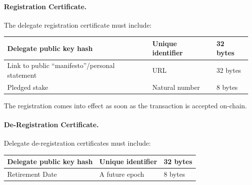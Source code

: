 

\paragraph{Registration Certificate.} The delegate registration certificate must include:

\begin{center}
\begin{tabular}{||l|p{3in}|l||}
  \hline\hline
  Delegate public key hash %
           & Unique identifier & 32 bytes
  \\\hline
  Link to public ``manifesto''/personal statement & URL & 32 bytes
  \\\hline
  Pledged stake & Natural number & 8 bytes
  \\\hline
  \hline
\end{tabular}
\end{center}

The registration comes into effect as soon as the transaction is accepted on-chain.

\paragraph{De-Registration Certificate.} Delegate de-registration certificates must include:

\begin{center}
\begin{tabular}{||l|p{3in}|l||}
  \hline\hline
  Delegate public key hash & Unique identifier & 32 bytes
  \\\hline
  Retirement Date & A future epoch & 8 bytes
  \\\hline
  \hline
\end{tabular}
\end{center}

